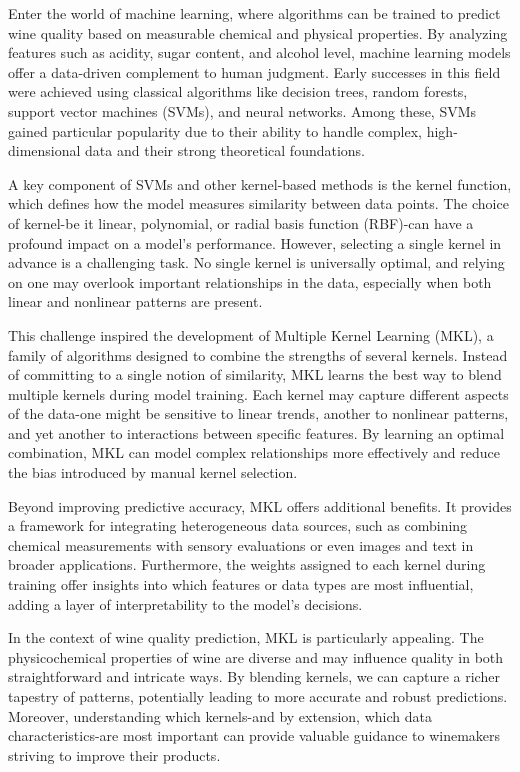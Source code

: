 \documentclass[11pt]{article}
\begin{document}
Enter the world of machine learning, where algorithms can be trained to predict wine quality based on measurable chemical and physical properties. By analyzing features such as acidity, sugar content, and alcohol level, machine learning models offer a data-driven complement to human judgment. Early successes in this field were achieved using classical algorithms like decision trees, random forests, support vector machines (SVMs), and neural networks. Among these, SVMs gained particular popularity due to their ability to handle complex, high-dimensional data and their strong theoretical foundations.

A key component of SVMs and other kernel-based methods is the kernel function, which defines how the model measures similarity between data points. The choice of kernel-be it linear, polynomial, or radial basis function (RBF)-can have a profound impact on a model’s performance. However, selecting a single kernel in advance is a challenging task. No single kernel is universally optimal, and relying on one may overlook important relationships in the data, especially when both linear and nonlinear patterns are present.

This challenge inspired the development of Multiple Kernel Learning (MKL), a family of algorithms designed to combine the strengths of several kernels. Instead of committing to a single notion of similarity, MKL learns the best way to blend multiple kernels during model training. Each kernel may capture different aspects of the data-one might be sensitive to linear trends, another to nonlinear patterns, and yet another to interactions between specific features. By learning an optimal combination, MKL can model complex relationships more effectively and reduce the bias introduced by manual kernel selection.

Beyond improving predictive accuracy, MKL offers additional benefits. It provides a framework for integrating heterogeneous data sources, such as combining chemical measurements with sensory evaluations or even images and text in broader applications. Furthermore, the weights assigned to each kernel during training offer insights into which features or data types are most influential, adding a layer of interpretability to the model’s decisions.

In the context of wine quality prediction, MKL is particularly appealing. The physicochemical properties of wine are diverse and may influence quality in both straightforward and intricate ways. By blending kernels, we can capture a richer tapestry of patterns, potentially leading to more accurate and robust predictions. Moreover, understanding which kernels-and by extension, which data characteristics-are most important can provide valuable guidance to winemakers striving to improve their products.
\end{document}
